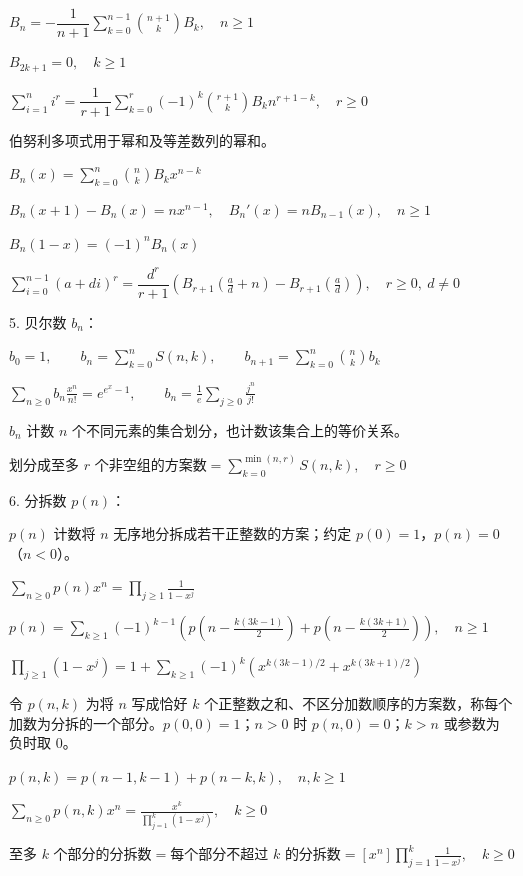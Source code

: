 $B_n=-\dfrac1{n+1}\displaystyle\sum_{k=0}^{n-1}\binom{n+1}k B_k,\quad n\ge1$

$B_{2k+1}=0,\quad k\ge1$

$\displaystyle\sum_{i=1}^{n}i^r=\dfrac1{r+1}\sum_{k=0}^{r}(-1)^k\binom{r+1}k B_kn^{r+1-k},\quad r\ge0$

伯努利多项式用于幂和及等差数列的幂和。\nopagebreak[4]

$B_n(x)=\displaystyle\sum_{k=0}^{n}\binom nk B_kx^{n-k}$

$B_n(x+1)-B_n(x)=nx^{n-1},\quad B_n'(x)=nB_{n-1}(x),\quad n\ge1$

$B_n(1-x)=(-1)^nB_n(x)$

$\displaystyle\sum_{i=0}^{n-1}(a+di)^r=\dfrac{d^r}{r+1}\left(B_{r+1}\left(\frac ad+n\right)-B_{r+1}\left(\frac ad\right)\right),\quad r\ge0,\ d\ne0$

5. 贝尔数 $b_n$：\nopagebreak[4]

$b_0=1,\qquad b_n=\displaystyle\sum_{k=0}^{n}S(n,k),\qquad b_{n+1}=\sum_{k=0}^{n}\binom nk b_k$

$\displaystyle\sum_{n\ge0}b_n\frac{x^n}{n!}=e^{e^x-1},\qquad b_n=\frac1e\sum_{j\ge0}\frac{j^n}{j!}$

$b_n$ 计数 $n$ 个不同元素的集合划分，也计数该集合上的等价关系。

$\text{划分成至多 $r$ 个非空组的方案数}=\displaystyle\sum_{k=0}^{\min(n,r)}S(n,k),\quad r\ge0$

6. 分拆数 $p(n)$：\nopagebreak[4]

$p(n)$ 计数将 $n$ 无序地分拆成若干正整数的方案；约定 $p(0)=1$，$p(n)=0$（$n<0$）。

$\displaystyle\sum_{n\ge0}p(n)x^n=\prod_{j\ge1}\frac1{1-x^j}$

$p(n)=\displaystyle\sum_{k\ge1}(-1)^{k-1}\left(p\left(n-\frac{k(3k-1)}2\right)+p\left(n-\frac{k(3k+1)}2\right)\right),\quad n\ge1$

$\displaystyle\prod_{j\ge1}(1-x^j)=1+\sum_{k\ge1}(-1)^k\left(x^{k(3k-1)/2}+x^{k(3k+1)/2}\right)$

令 $p(n,k)$ 为将 $n$ 写成恰好 $k$ 个正整数之和、不区分加数顺序的方案数，称每个加数为分拆的一个部分。$p(0,0)=1$；$n>0$ 时 $p(n,0)=0$；$k>n$ 或参数为负时取 $0$。

$p(n,k)=p(n-1,k-1)+p(n-k,k),\quad n,k\ge1$

$\displaystyle\sum_{n\ge0}p(n,k)x^n=\frac{x^k}{\prod_{j=1}^{k}(1-x^j)},\quad k\ge0$

$\text{至多 $k$ 个部分的分拆数}=\text{每个部分不超过 $k$ 的分拆数}=[x^n]\displaystyle\prod_{j=1}^{k}\frac1{1-x^j},\quad k\ge0$

